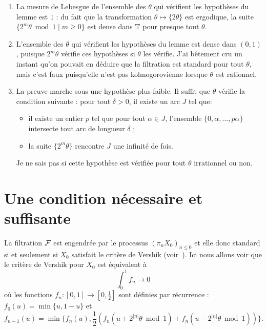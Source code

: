 \documentclass[12pt,a4paper]{article}
\begin{document}
\begin{enumerate}
\item La mesure de Lebesgue de l'ensemble des $\theta$ qui vérifient les hypothèses du lemme 
est $1$ : du fait que la transformation $\theta \mapsto \{2\theta\}$ est ergodique,  
la suite 
$\{2^m\theta\bmod 1 \mid m \geq 0\}$ est dense dans $\mathbb{T}$ pour presque tout $\theta$.

\item L'ensemble des $\theta$ qui vérifient les hypothèses du lemme est dense dans $(0,1)$, 
puisque $2^m\theta$ vérifie ces hypothèses si $\theta$ les vérifie. 
J'ai bêtement cru un instant qu'on pouvait en déduire que la filtration est 
standard pour tout $\theta$, mais c'est faux puisqu'elle n'est pas kolmogorovienne 
lorsque $\theta$ est rationnel. 

\item La preuve marche sous une hypothèse plus faible. Il suffit que $\theta$ 
vérifie la condition suivante : pour tout $\delta>0$, il existe un arc $J$ tel que:
\begin{itemize}
\item il existe un entier $p$ tel que 
pour tout $\alpha \in J$, l'ensemble $\{0, \alpha, \ldots, p\alpha\}$ 
intersecte tout arc de longueur $\delta$ ;

\item la suite $\{2^m\theta\}$ rencontre $J$ une infinité de fois.
\end{itemize}
Je ne sais pas si cette hypothèse est vérifiée pour tout $\theta$ irrationnel ou non.
\end{enumerate}
 
 

\section{Une condition nécessaire et suffisante}

La filtration $\mathcal{F}$ est engendrée par le processus ${(\pi_n X_0)}_{n \leq 0}$ 
et elle donc standard si et seulement si $X_0$ satisfait le critère de 
Vershik (voir~\cite{LauXLV}). 
Ici nous allons voir que le critère de Vershik pour $X_0$ est équivalent à 
$$
\boxed{\int_0^1 f_n \to 0}
$$
où les fonctions $f_n \colon [0,1] \to [0,\frac12]$ sont définies par récurrence :  $f_0(u)=\min\bigl\{u,1-u\bigr\}$ et $$f_{n-1}(u) = \min\bigl\{f_{n}(u), \frac{1}{2}\left(f_{n}(u+2^{|n|}\theta \bmod 1) + f_{n}(u-2^{|n|}\theta \bmod1)\right) \bigr\}.$$ 
\end{document}

